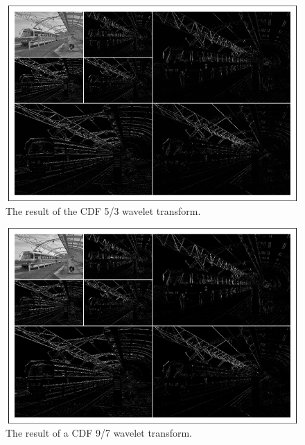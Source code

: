 \documentclass[titlepage,12pt]{article}
\begin{document}
\begin{figure}
    \centering
    \includegraphics[scale=0.25]{resources/example/losslessTransform.png}
    \caption{The result of the CDF 5/3 wavelet transform.}
    \label{fig:losslessTransform}
\end{figure}

\begin{figure}
    \centering
    \includegraphics[scale=0.25]{resources/example/lossyTransform.png}
    \caption{The result of a CDF 9/7 wavelet transform.}
    \label{fig:lossyTransform}
\end{figure}
\end{document}
